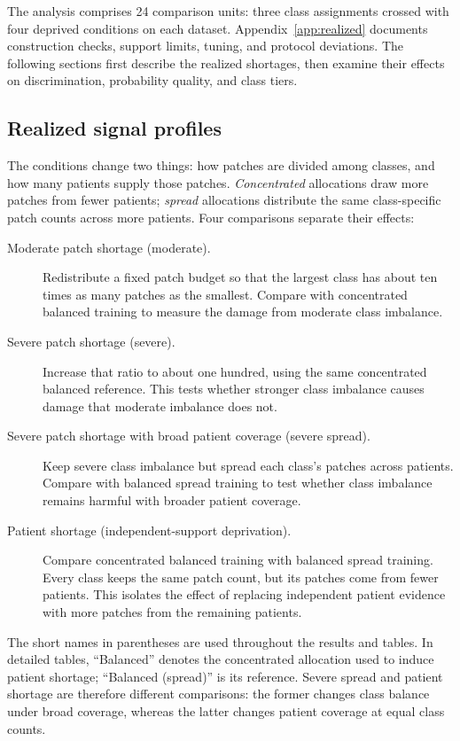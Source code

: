 \documentclass[11pt]{article}
\begin{document}
The analysis comprises \num{24} comparison units: three class assignments crossed with four deprived conditions on each dataset. Appendix~\ref{app:realized} documents construction checks, support limits, tuning, and protocol deviations. The following sections first describe the realized shortages, then examine their effects on discrimination, probability quality, and class tiers.
\subsection{Realized signal profiles}
\label{sec:rq1-profiles}
The conditions change two things: how patches are divided among classes, and how many patients supply those patches. \emph{Concentrated} allocations draw more patches from fewer patients; \emph{spread} allocations distribute the same class-specific patch counts across more patients. Four comparisons separate their effects:
\begin{description}
  \item[Moderate patch shortage (moderate).] Redistribute a fixed patch budget so that the largest class has about ten times as many patches as the smallest. Compare with concentrated balanced training to measure the damage from moderate class imbalance.
  \item[Severe patch shortage (severe).] Increase that ratio to about one hundred, using the same concentrated balanced reference. This tests whether stronger class imbalance causes damage that moderate imbalance does not.
  \item[Severe patch shortage with broad patient coverage (severe spread).] Keep severe class imbalance but spread each class's patches across patients. Compare with balanced spread training to test whether class imbalance remains harmful with broader patient coverage.
  \item[Patient shortage (independent-support deprivation).] Compare concentrated balanced training with balanced spread training. Every class keeps the same patch count, but its patches come from fewer patients. This isolates the effect of replacing independent patient evidence with more patches from the remaining patients.
\end{description}
\noindent The short names in parentheses are used throughout the results and tables. In detailed tables, ``Balanced'' denotes the concentrated allocation used to induce patient shortage; ``Balanced (spread)'' is its reference. Severe spread and patient shortage are therefore different comparisons: the former changes class balance under broad coverage, whereas the latter changes patient coverage at equal class counts.
\end{document}
